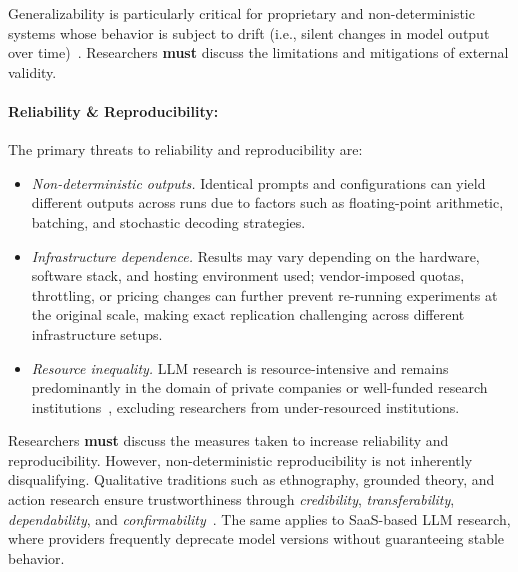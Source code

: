 \documentclass[smallextended]{svjour3}
\newcommand{\must}{\textbf{must}\xspace}
\begin{document}
Generalizability is particularly critical for proprietary and non-deterministic systems whose behavior is subject to drift (i.e., silent changes in model output over time)~\cite{DBLP:journals/corr/abs-2307-09009}. Researchers \must discuss the limitations and mitigations of external validity.

\paragraph{Reliability \& Reproducibility:}
The primary threats to reliability and reproducibility are:
\begin{itemize}
    \item \emph{Non-deterministic outputs.} Identical prompts and configurations can yield different outputs across runs due to factors such as floating-point arithmetic, batching, and stochastic decoding strategies.
    \item \emph{Infrastructure dependence.} Results may vary depending on the hardware, software stack, and hosting environment used; vendor-imposed quotas, throttling, or pricing changes can further prevent re-running experiments at the original scale, making exact replication challenging across different infrastructure setups.
    \item \emph{Resource inequality.} LLM research is resource-intensive and remains predominantly in the domain of private companies or well-funded research institutions~\cite{schwartz2020green, ahmed2023industry}, excluding researchers from under-resourced institutions.
\end{itemize}

Researchers \must discuss the measures taken to increase reliability and reproducibility.
However, non-deterministic reproducibility is not inherently disqualifying. Qualitative traditions such as ethnography, grounded theory, and action research ensure trustworthiness through \emph{credibility}, \emph{transferability}, \emph{dependability}, and \emph{confirmability}~\cite{guba1981criteria}.
The same applies to SaaS-based LLM research, where providers frequently deprecate model versions without guaranteeing stable behavior.
\end{document}
